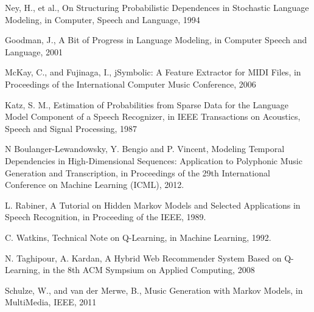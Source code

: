 \documentclass{article}
\begin{document}
\begin{thebibliography}{9}

Ney, H., et al., On Structuring Probabilistic Dependences in Stochastic Language Modeling, in Computer, Speech and Language, 1994

Goodman, J., A Bit of Progress in Language Modeling, in Computer Speech and Language, 2001

McKay, C., and Fujinaga, I., jSymbolic: A Feature Extractor for MIDI Files, in Proceedings of the International Computer Music Conference, 2006

Katz, S. M., Estimation of Probabilities from Sparse Data for the Language Model Component of a Speech Recognizer, in IEEE Transactions on Acoustics, Speech and Signal Processing, 1987

N Boulanger-Lewandowsky, Y. Bengio and P. Vincent, Modeling Temporal Dependencies in High-Dimensional Sequences: Application to Polyphonic Music Generation and Transcription, in Proceedings of the 29th International Conference on Machine Learning (ICML), 2012.

L. Rabiner, A Tutorial on Hidden Markov Models and Selected Applications in Speech Recognition, in Proceeding of the IEEE, 1989.

C. Watkins, Technical Note on Q-Learning, in Machine Learning, 1992.

N. Taghipour, A. Kardan, A Hybrid Web Recommender System Based on Q-Learning, in the 8th ACM Sympsium on Applied Computing, 2008

Schulze, W., and van der Merwe, B., Music Generation with Markov Models, in MultiMedia, IEEE, 2011

\end{thebibliography}
\end{document}
